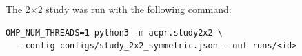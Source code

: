 The 2$\times$2 study was run with the following command:
\begin{verbatim}
OMP_NUM_THREADS=1 python3 -m acpr.study2x2 \
  --config configs/study_2x2_symmetric.json --out runs/<id>
\end{verbatim}
